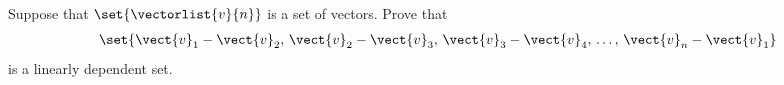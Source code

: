 Suppose that $\set{\vectorlist{v}{n}}$ is a set of vectors.   Prove that 
%
\begin{align*}
\set{\vect{v}_1-\vect{v}_2,\,\vect{v}_2-\vect{v}_3,\,\vect{v}_3-\vect{v}_4,\,\dots,\,\vect{v}_n-\vect{v}_1}
\end{align*}
%
 is a linearly dependent set.

